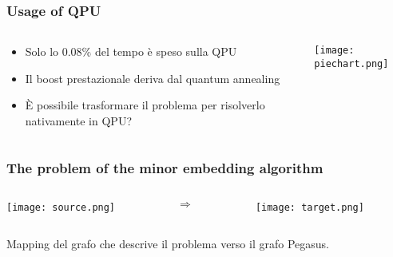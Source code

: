 \documentclass[aspectratio=169]{beamer}
\begin{document}
\begin{frame}
    \frametitle{Usage of QPU}

    \begin{columns}
        \begin{column}{0.4\textwidth}
            \begin{itemize}
                \item Solo lo 0.08\% del tempo è speso sulla QPU
                \item Il boost prestazionale deriva dal quantum annealing
                \item È possibile trasformare il problema per risolverlo nativamente in QPU?
            \end{itemize}
        \end{column}
        \begin{column}{0.6\textwidth}
            \begin{flushright}
                \texttt{[image: piechart.png]}
            \end{flushright}
        \end{column}
    \end{columns}

\end{frame}

\begin{frame}
    \frametitle{The problem of the minor embedding algorithm}

    \begin{columns}
        \begin{column}{0.4\textwidth}
            \begin{flushleft}
                \texttt{[image: source.png]}
            \end{flushleft}
        \end{column}
        \begin{column}{0.1\textwidth}
            \LARGE
            $\Longrightarrow$
        \end{column}
        \begin{column}{0.4\textwidth}
            \begin{flushright}
                \texttt{[image: target.png]}
            \end{flushright}
        \end{column}
    \end{columns}

    \begin{center}
        Mapping del grafo che descrive il problema verso il grafo Pegasus.        
    \end{center}

\end{frame}
\end{document}
